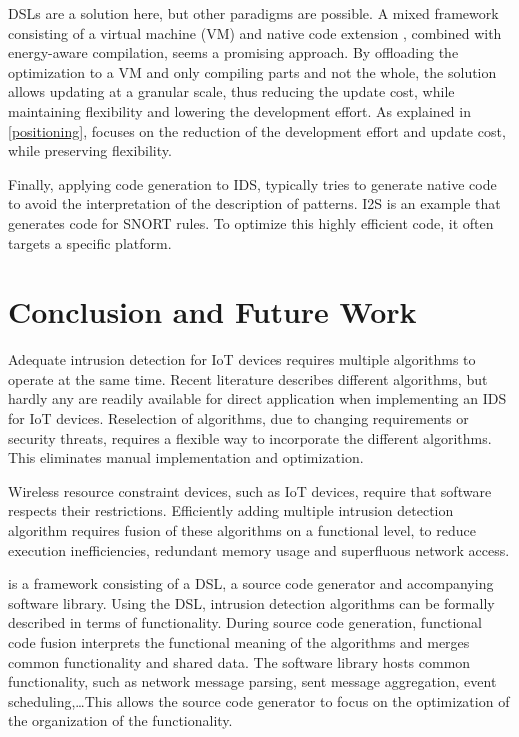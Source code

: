 \documentclass[conference]{IEEEtran}
\begin{document}
DSLs are a solution here, but other paradigms are possible. A mixed framework
consisting of a virtual machine (VM) and native code
extension \cite{sadilek2007energy}, combined with energy-aware compilation,
seems a promising approach. By offloading the optimization to a VM and only
compiling parts and not the whole, the solution allows updating at a granular
scale, thus reducing the update cost, while maintaining flexibility and
lowering the development effort. As explained in \ref{positioning}, \NAME
focuses on the reduction of the development effort and update cost, while
preserving flexibility.

Finally, applying code generation to IDS, typically tries to generate native
code to avoid the interpretation of the description of patterns.
I2S \cite{charitakis2003code} is an example that generates code for
SNORT \cite{roesch1999snort} rules. To optimize this highly efficient code, it
often targets a specific platform.

\section{Conclusion and Future Work}
\label{conclusion}

Adequate intrusion detection for IoT devices requires multiple algorithms to
operate at the same time. Recent literature describes different algorithms, but
hardly any are readily available for direct application when implementing an
IDS for IoT devices. Reselection of algorithms, due to changing requirements or
security threats, requires a flexible way to incorporate the different
algorithms. This eliminates manual implementation and optimization.

Wireless resource constraint devices, such as IoT devices, require that
software respects their restrictions. Efficiently adding multiple intrusion
detection algorithm requires fusion of these algorithms on a functional level,
to reduce execution inefficiencies, redundant memory usage and superfluous
network access.

\NAME is a framework consisting of a DSL, a source code generator and
accompanying software library. Using the DSL, intrusion detection algorithms
can be formally described in terms of functionality. During source code
generation, functional code fusion interprets the functional meaning of the
algorithms and merges common functionality and shared data. The software
library hosts common functionality, such as network message parsing, sent
message aggregation, event scheduling,\dots This allows the source code
generator to focus on the optimization of the organization of the functionality.
\end{document}
